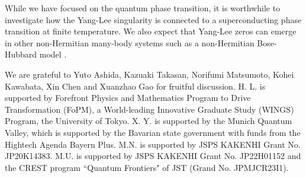 \documentclass[aps,prl,twocolumn,superscriptaddress]{revtex4-1}
\begin{document}
\begin{bibunit}[apsrev4-2]
While we have focused on the quantum phase transition, it is worthwhile
to investigate how the Yang-Lee singularity is connected to a superconducting
phase transition at finite temperature. We also expect that Yang-Lee
zeros can emerge in other non-Hermitian many-body systems such as
a non-Hermitian Bose-Hubbard model \cite{PhysRevA.94.053615}.

We are grateful to Yuto Ashida, Kazuaki Takasan, Norifumi Matsumoto,
Kohei Kawabata, Xin Chen and Xuanzhao Gao for fruitful discussion.
H. L. is supported by Forefront Physics and Mathematics Program to
Drive Transformation (FoPM), a World-leading Innovative Graduate Study
(WINGS) Program, the University of Tokyo. X. Y. is supported by the
Munich Quantum Valley, which is supported by the Bavarian state government
with funds from the Hightech Agenda Bayern Plus. M.N. is supported
by JSPS KAKENHI Grant No. JP20K14383. M.U. is supported by JSPS KAKENHI
Grant No. JP22H01152 and the CREST program ``Quantum Frontiers" of JST (Grand No. JPMJCR23I1).
%
\end{bibunit}
\end{document}
